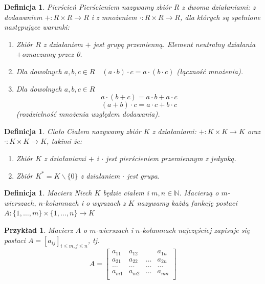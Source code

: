 \documentclass[12pt,a4paper]{report}
\newtheorem{definition}[theorem]{Definicja}
\newtheorem{example}{Przykład}
\begin{document}
\begin{definition}{Pierścień \cite[Rozdział 0]{banaszak2002}}
Pierścieniem nazywamy zbiór $R$ z dwoma działaniami: z dodawaniem $+: R\times R \rightarrow R$ i z mnożeniem $\cdot: R \times R \rightarrow R$, dla których są spełnione następujące warunki:
\begin{enumerate}
\item Zbiór $R$ z działaniem $+$ jest grupą przemienną. Element neutralny działania $+$oznaczamy przez 0.
\item Dla dowolnych $a,b,c \in R \quad (a\cdot b)\cdot c=a\cdot(b\cdot c)$ (łączność mnożenia).
\item Dla dowolnych $a, b,c \in R$
$$
a \cdot (b+c)=a\cdot b + a\cdot c
$$
$$
(a+b) \cdot c=a\cdot c + b\cdot c
$$(rozdzielność mnożenia względem dodawania).
\end{enumerate}

\end{definition}

\begin{definition}{Ciało \cite[Rozdział 0]{banaszak2002}}
Ciałem nazywamy zbiór $K$ z działaniami: $+: K\times K \rightarrow K$ oraz $\cdot: K \times K \rightarrow K$, takimi że:
\begin{enumerate}
\item Zbiór $K$ z działaniami $+$ i $\cdot$ jest pierścieniem przemiennym z jedynką.
\item Zbiór $K^{*}=K \backslash \{0\}$ z działaniem $\cdot$ jest grupa.
\end{enumerate}
\end{definition}

\begin{definition}{Macierz \cite[Rozdział 1]{banaszak2002}}
Niech $K$ będzie ciałem i $m, n \in \mathbb{N}$. Macierzą o $m$-wierszach, $n$-kolumnach i o wyrazach z $K$ nazywamy każdą funkcję postaci
$A: \{1,\ldots, m \} \times \{1, \ldots, n\} \rightarrow K$
\end{definition}

\begin{example}
Macierz $A$ o $m$-wierszach i $n$-kolumnach najczęściej zapisuje się postaci $A= [a_{ij}]_{i \leq m, j \leq n}$, tj. 
$$
A= \begin{bmatrix}
a_{11} & a_{12} &  & a_{1n} \\
a_{21} & a_{22} & \ldots & a_{2n}\\ 
\ldots & \ldots & \ldots & \ldots\\
a_{m1} & a_{m2} & \ldots & a_{mn} \\
\end{bmatrix}    
$$
\end{example}
\end{document}
